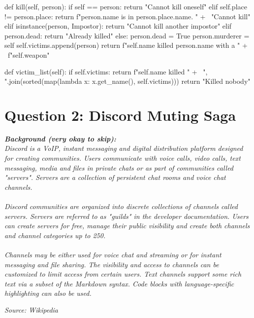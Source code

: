 \begin{python}
    def kill(self, person):
        if self == person:
            return "Cannot kill oneself"
        elif self.place != person.place:
            return f"{person.name} is in {person.place.name}. " + \
                   "Cannot kill"
        elif isinstance(person, Impostor):
            return "Cannot kill another impostor"
        elif person.dead:
            return "Already killed"
        else:
            person.dead = True
            person.murderer = self
            self.victims.append(person)
            return f"{self.name} killed {person.name} with a " + \
                   f"{self.weapon}"

    def victim_list(self):
        if self.victims:
            return f"{self.name} killed " + \
                   ", ".join(sorted(map(lambda x: x.get_name(),
                                        self.victims)))
        return "Killed nobody"
\end{python}

\newpage

\section{Question 2: Discord Muting Saga}
\textbf{\textit{Background (very okay to skip):}} \\
\textit{
Discord is a VoIP, instant messaging and digital distribution platform designed for creating communities. 
Users communicate with voice calls, video calls, text messaging, media and files in private chats or as part 
of communities called "servers". Servers are a collection of persistent chat rooms and voice chat channels. \\ \\
Discord communities are organized into discrete collections of channels called servers. Servers are referred to as 
"guilds" in the developer documentation. Users can create servers for free, manage their public visibility and 
create both channels and channel categories up to 250. \\ \\
Channels may be either used for voice chat and streaming or for instant messaging and file sharing. The visibility 
and access to channels can be customized to limit access from certain users. Text channels support some rich text via 
a subset of the Markdown syntax. Code blocks with language-specific highlighting can also be used.
}
\begin{flushright}
    \textit{Source: Wikipedia}
\end{flushright}

